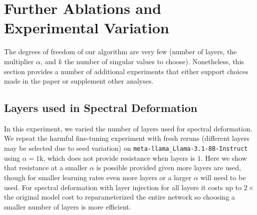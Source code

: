 \documentclass{article}
\theoremstyle{plain}
\theoremstyle{definition}
\theoremstyle{remark}
\begin{document}
\section{Further Ablations and Experimental Variation}
\label{app:further-ablations}
The degrees of freedom of our algorithm are very few (number of layers, the multiplier $\alpha$, and $k$ the number of singular values to choose). Nonetheless, this section provides a number of additional experiments that either support choices made in the paper or supplement other analyses.

\subsection{Layers used in Spectral Deformation}
\label{app:num_layers}
In this experiment, we varied the number of layers used for spectral deformation. We repeat the harmful fine-tuning experiment with fresh reruns (different layers may be selected due to seed variation) on \texttt{meta-llama\_Llama-3.1-8B-Instruct} using $\alpha = 1\mathrm{k}$, which does not provide resistance when layers is $1$. Here we show that resistance at a smaller $\alpha$ is possible provided given more layers are used, though for smaller learning rates even more layers or a larger $\alpha$ will need to be used. For spectral deformation with layer injection for all layers it costs up to $2\times$ the original model cost to reparameterized the entire network so choosing a smaller number of layers is more efficient. 
\end{document}
